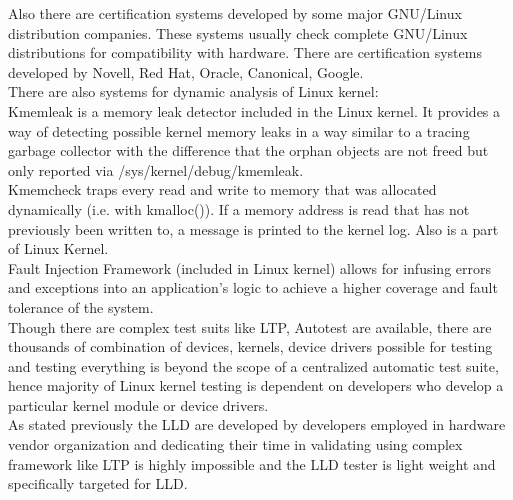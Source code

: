 Also there are certification systems developed by some major GNU/Linux distribution companies. These systems usually check complete GNU/Linux distributions for compatibility with hardware. There are certification systems developed by Novell, Red Hat, Oracle, Canonical, Google.\\

There are also systems for dynamic analysis of Linux kernel: \\

Kmemleak is a memory leak detector included in the Linux kernel. It provides a way of detecting possible kernel memory leaks in a way similar to a tracing garbage collector with the difference that the orphan objects are not freed but only reported via /sys/kernel/debug/kmemleak. \\

Kmemcheck traps every read and write to memory that was allocated dynamically (i.e. with kmalloc()). If a memory address is read that has not previously been written to, a message is printed to the kernel log. Also is a part of Linux Kernel. \\

Fault Injection Framework (included in Linux kernel) allows for infusing errors and exceptions into an application's logic to achieve a higher coverage and fault tolerance of the system. \\

Though there are complex test suits like LTP, Autotest are available, there are thousands of combination of devices, kernels, device drivers possible for testing and testing everything is beyond the scope of a centralized automatic test suite, hence majority of Linux kernel testing is dependent on developers who develop a particular kernel module or device drivers.   \\

As stated previously the LLD are developed by developers employed in hardware vendor organization and dedicating their time in validating using complex framework like LTP is highly impossible and the LLD tester is light weight and specifically targeted for LLD.\\



